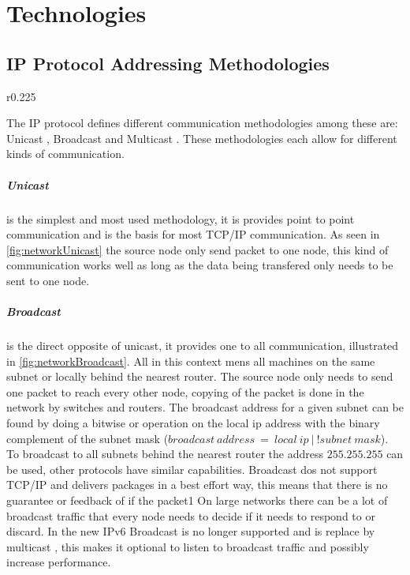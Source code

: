 \chapter{Technologies}

\section{IP Protocol Addressing Methodologies}

\begin{wrapfigure}{r}{0.225\textwidth}
	
\end{wrapfigure}
The IP protocol defines different communication methodologies among these are: Unicast \cite{MISSING REF}, Broadcast \cite{MISSING REF} and Multicast \cite{MISSING REF}.
These methodologies each allow for different kinds of communication.
				
\paragraph{Unicast}
is the simplest and most used methodology, it is provides point to point communication and is the basis for most TCP/IP communication. %
As seen in \cref{fig:networkUnicast} the source node only send packet to one node, this kind of communication works well as long as the data being transfered only needs to be sent to one node.

\paragraph{Broadcast}
is the direct opposite of unicast, it provides one to all communication, illustrated in \cref{fig:networkBroadcast}. All in this context mens all machines on the same subnet or locally behind the nearest router.
The source node only needs to send one packet to reach every other node, copying of the packet is done in the network by switches and routers.
The broadcast address for a given subnet can be found by doing a bitwise or operation on the local ip address with the binary complement of the subnet mask ($broadcast~address~=~local~ip~|~!subnet~mask$). To broadcast to all subnets behind the nearest router the address $255.255.255$ can be used, other protocols have similar capabilities.
Broadcast dos not support TCP/IP and delivers packages in a best effort way, this means that there is no guarantee or feedback of if the packet1
On large networks there can be a lot of broadcast traffic that every node needs to decide if it needs to respond to or discard.
In the new IPv6 Broadcast is no longer supported and is replace by multicast \cite{MISSING_REF}, this makes it optional to listen to broadcast traffic and possibly increase performance.

